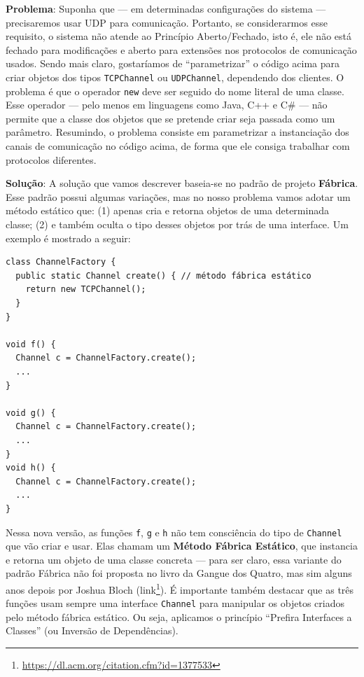 \documentclass[
  11pt,
  twoside]{book}
\newcommand{\passthrough}[1]{#1}
\DeclareRobustCommand{\href}[2]{#2\footnote{\url{#1}}}
\begin{document}
\textbf{Problema}: Suponha que --- em determinadas configurações do
sistema --- precisaremos usar UDP para comunicação. Portanto, se
considerarmos esse requisito, o sistema não atende ao Princípio
Aberto/Fechado, isto é, ele não está fechado para modificações e aberto
para extensões nos protocolos de comunicação usados. Sendo mais claro,
gostaríamos de ``parametrizar'' o código acima para criar objetos dos
tipos \passthrough{\lstinline!TCPChannel!} ou
\passthrough{\lstinline!UDPChannel!}, dependendo dos clientes. O
problema é que o operador \passthrough{\lstinline!new!} deve ser seguido
do nome literal de uma classe. Esse operador --- pelo menos em
linguagens como Java, C++ e C\# --- não permite que a classe dos objetos
que se pretende criar seja passada como um parâmetro. Resumindo, o
problema consiste em parametrizar a instanciação dos canais de
comunicação no código acima, de forma que ele consiga trabalhar com
protocolos diferentes.

\textbf{Solução}: A solução que vamos descrever baseia-se no padrão de
projeto \textbf{Fábrica}. Esse padrão possui algumas variações, mas no
nosso problema vamos adotar um método estático que: (1) apenas cria e
retorna objetos de uma determinada classe; (2) e também oculta o tipo
desses objetos por trás de uma interface. Um exemplo é mostrado a
seguir:

\begin{lstlisting}
class ChannelFactory {
  public static Channel create() { // método fábrica estático
    return new TCPChannel();
  }
}

void f() {
  Channel c = ChannelFactory.create();  
  ...
}

void g() {
  Channel c = ChannelFactory.create();
  ...
}
void h() {
  Channel c = ChannelFactory.create();
  ...
}
\end{lstlisting}

 
Nessa nova versão, as funções \passthrough{\lstinline!f!},
\passthrough{\lstinline!g!} e \passthrough{\lstinline!h!} não tem
consciência do tipo de \passthrough{\lstinline!Channel!} que vão criar e
usar. Elas chamam um \textbf{Método Fábrica Estático}, que instancia e
retorna um objeto de uma classe concreta --- para ser claro, essa
variante do padrão Fábrica não foi proposta no livro da Gangue dos
Quatro, mas sim alguns anos depois por Joshua Bloch
(\href{https://dl.acm.org/citation.cfm?id=1377533}{link}). É importante
também destacar que as três funções usam sempre uma interface
\passthrough{\lstinline!Channel!} para manipular os objetos criados pelo
método fábrica estático. Ou seja, aplicamos o princípio ``Prefira
Interfaces a Classes'' (ou Inversão de Dependências).
\end{document}
